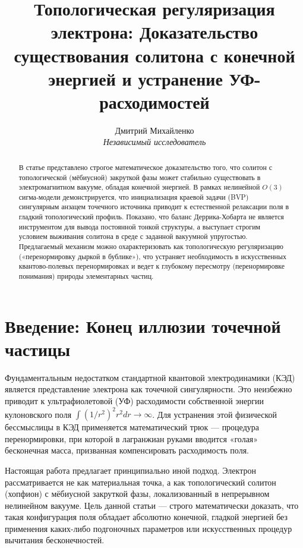 \documentclass[12pt,a4paper]{article}
\begin{document}
\title{\textbf{Топологическая регуляризация электрона: Доказательство существования солитона с конечной энергией и устранение УФ-расходимостей}}
\author{Дмитрий Михайленко \\ \textit{\small Независимый исследователь}}
\date{}
\maketitle

\begin{abstract}
В статье представлено строгое математическое доказательство того, что солитон с топологической (мёбиусной) закруткой фазы может стабильно существовать в электромагнитном вакууме, обладая конечной энергией. В рамках нелинейной $O(3)$ сигма-модели демонстрируется, что инициализация краевой задачи (BVP) сингулярным анзацем точечного источника приводит к естественной релаксации поля в гладкий топологический профиль. Показано, что баланс Деррика-Хобарта не является инструментом для вывода постоянной тонкой структуры, а выступает строгим условием выживания солитона в среде с заданной вакуумной упругостью. Предлагаемый механизм можно охарактеризовать как топологическую регуляризацию («перенормировку дыркой в бублике»), что устраняет необходимость в искусственных квантово-полевых перенормировках и ведет к глубокому пересмотру (перенормировке понимания) природы элементарных частиц.
\end{abstract}

\section{Введение: Конец иллюзии точечной частицы}
Фундаментальным недостатком стандартной квантовой электродинамики (КЭД) является представление электрона как точечной сингулярности. Это неизбежно приводит к ультрафиолетовой (УФ) расходимости собственной энергии кулоновского поля $\int (1/r^2)^2 r^2 dr \to \infty$. Для устранения этой физической бессмыслицы в КЭД применяется математический трюк — процедура перенормировки, при которой в лагранжиан руками вводится «голая» бесконечная масса, призванная компенсировать расходимость поля.

Настоящая работа предлагает принципиально иной подход. Электрон рассматривается не как материальная точка, а как топологический солитон (хопфион) с мёбиусной закруткой фазы, локализованный в непрерывном нелинейном вакууме. Цель данной статьи — строго математически доказать, что такая конфигурация поля обладает абсолютно конечной, гладкой энергией без применения каких-либо подгоночных параметров или искусственных процедур вычитания бесконечностей.
\end{document}
